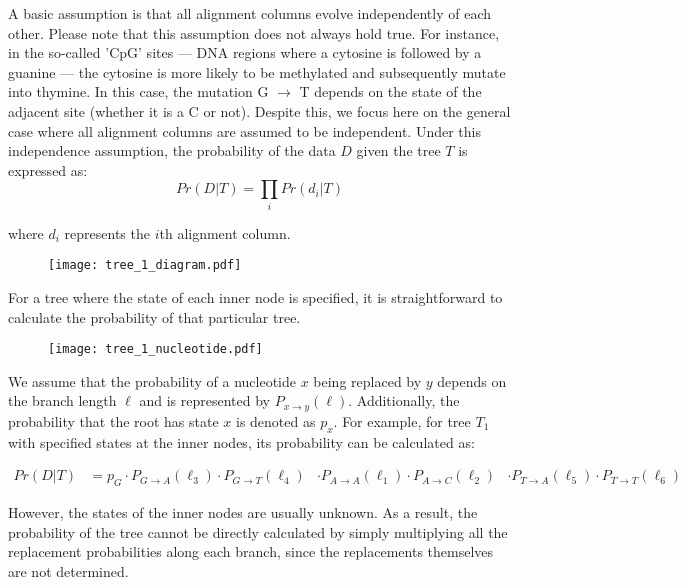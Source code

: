 \documentclass[12pt]{book}
\begin{document}
        A basic assumption is that all alignment columns evolve independently of each other. Please note that this assumption does not always hold true. For instance, in the so-called 'CpG' sites — DNA regions where a cytosine is followed by a guanine — the cytosine is more likely to be methylated and subsequently mutate into thymine. In this case, the mutation G $\rightarrow$ T depends on the state of the adjacent site (whether it is a C or not). Despite this, we focus here on the general case where all alignment columns are assumed to be independent. Under this independence assumption, the probability of the data $D$ given the tree $T$ is expressed as:
        \begin{equation}
            Pr(D|T) = \prod_{i} Pr(d_i|T)
        \end{equation}
        
        where $d_i$ represents the $i$th alignment column. 

        \begin{figure}[htbp]
            \centering
            \texttt{[image: tree\_1\_diagram.pdf]}
        \end{figure}

        For a tree where the state of each inner node is specified, it is straightforward to calculate the probability of that particular tree.
        
        \begin{figure}[htbp]
            \centering
            \texttt{[image: tree\_1\_nucleotide.pdf]}
        \end{figure}

        We assume that the probability of a nucleotide $x$ being replaced by $y$ depends on the branch length $\ell$ and is represented by $P_{x \rightarrow y}(\ell)$. Additionally, the probability that the root has state $x$ is denoted as $p_x$. For example, for tree $T_1$ with specified states at the inner nodes, its probability can be calculated as:

        \begin{align*}
            Pr(D|T) &= p_G \cdot P_{G \rightarrow A}(\ell_3) \cdot P_{G \rightarrow T}(\ell_4)
            &\cdot P_{A \rightarrow A}(\ell_1) \cdot P_{A \rightarrow C}(\ell_2)
            &\cdot P_{T \rightarrow A}(\ell_5) \cdot P_{T \rightarrow T}(\ell_6)
        \end{align*}

        However, the states of the inner nodes are usually unknown. As a result, the probability of the tree cannot be directly calculated by simply multiplying all the replacement probabilities along each branch, since the replacements themselves are not determined.
        
\end{document}
